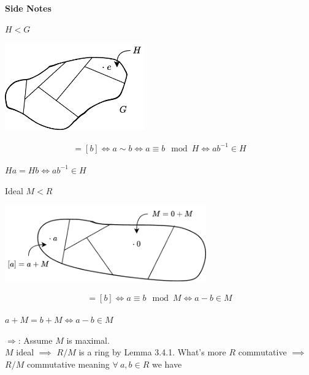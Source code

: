 \begin{theorem}
    \begin{tcolorbox}[width=5in, center=true]
    \begin{center}
        \textbf{Side Notes}
    \end{center}
    $H<G$
    \begin{center}
        \includegraphics[width=0.45\textwidth]{Figures/subgroup_idk.png}
    \end{center}
    \begin{align}
        [a]=[b]\iff a\sim b \iff a \equiv b \mod H \iff ab^{-1}\in H \nonumber
    \end{align}
    \begin{center}
    \begin{tcolorbox}[width=0.4\textwidth]
        $Ha = Hb \iff ab^{-1}\in H$
    \end{tcolorbox}
    \end{center}
    Ideal $M<R$
    \begin{center}
        \includegraphics[width=0.65\textwidth]{Figures/Ideal_idk.png}
    \end{center}
    \begin{align}
        [a]=[b]\iff a\equiv b \mod M \iff a-b\in M \nonumber
    \end{align}
    \begin{center}
    \begin{tcolorbox}[width=0.5\textwidth]
        $a+M=b+M \iff a-b \in M$
    \end{tcolorbox}
    \end{center}
    \end{tcolorbox}
    \noindent $\Rightarrow$:  Assume $M$ is maximal. \\
    $M$ ideal $\implies$ $R/M$ is a ring by Lemma 3.4.1. What's more $R$ commutative $\implies$ $R/M$ commutative meaning $\forall \ a,b \in R$ we have 

\end{theorem}
